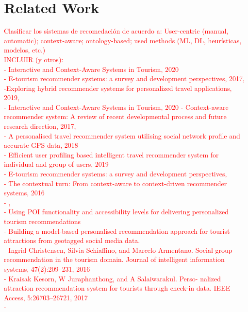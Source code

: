 \section{Related Work}

\textcolor{red}{Clasificar los sistemas de recomedación de acuerdo a: User-centric (manual, automatic); context-aware; ontology-based; used methods (ML, DL, heurísticas, modelos, etc.)\\
INCLUIR (y otros):\\
- Interactive and Context-Aware Systems in Tourism, 2020 \cite{jannach2020interactive}\\
- E-tourism recommender systems: a survey and development perspectives, 2017, \cite{artemenko2017tourism}\\
-Exploring hybrid recommender systems for personalized travel applications, 2019, \cite{logesh2019exploring}\\
- Interactive and Context-Aware Systems in Tourism, 2020
- Context-aware recommender system: A review of recent developmental process and future research direction, 2017,\\ 
- A personalised travel recommender system utilising social network profile and accurate GPS data, 2018\\
- Efficient user profiling based intelligent travel recommender system for individual and group of users, 2019\\
- E-tourism recommender systems: a survey and development perspectives,\\
- The contextual turn: From context-aware to context-driven recommender systems, 2016\\
- \cite{adomavicius2011context,rajaonarivo2019recommendation},\\
- Using POI functionality and accessibility levels for delivering personalized tourism recommendations\\
- Building a model-based personalised recommendation approach
for tourist attractions from geotagged social media data.\\
- Ingrid Christensen, Silvia Schiaffino, and Marcelo Armentano.
Social group recommendation in the tourism domain. Journal
of intelligent information systems, 47(2):209–231, 2016\\
- Kraisak Kesorn, W Juraphanthong, and A Salaiwarakul. Perso-
nalized attraction recommendation system for tourists through
check-in data. IEEE Access, 5:26703–26721, 2017\\
-
}




